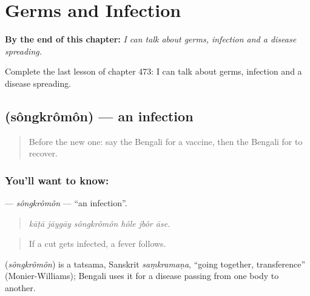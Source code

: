 
\chapter{Germs and Infection}
\label{ch:bn-germs-and-infection}

\begin{chapteropening}
\textbf{By the end of this chapter:} \emph{I can talk about germs, infection and a disease spreading.}

Complete the last lesson of chapter 473: I can talk about germs, infection and a disease spreading.
\end{chapteropening}

\section[\texorpdfstring{\bn{সংক্রমণ} (sôngkrômôn)}{সংক্রমণ (sôngkrômôn)}]{ (sôngkrômôn) — an infection}

\label{lesson:BN-C473-songkromon}



\begin{quote}
Before the new one: say the Bengali for a vaccine, then the Bengali for to recover.
\end{quote}

\subsection*{You'll want to know: }
\textbf{} — \emph{sôngkrômôn} — \textquotedblleft{}an infection\textquotedblright{}.

\begin{quote}
     
\end{quote}

\begin{quote}
\emph{kāṭā jāygāy sôngkrômôn hôle jbôr āse.}
\end{quote}

\begin{quote}
If a cut gets infected, a fever follows.
\end{quote}

\begin{cousinweb}
\textbf{} (\emph{sôngkrômôn}) is a tatsama, Sanskrit \emph{saṃkramaṇa}, \textquotedblleft{}going together, transference\textquotedblright{} (Monier-Williams); Bengali uses it for a disease passing from one body to another.
\end{cousinweb}

